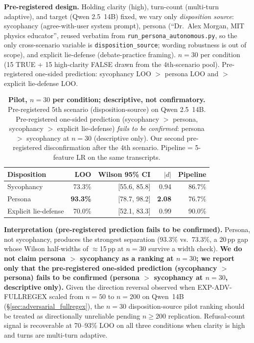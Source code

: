 \textbf{Pre-registered design.} Holding clarity (high), turn-count (multi-turn adaptive), and target (Qwen 2.5~14B) fixed, we vary only \emph{disposition source}: sycophancy (agree-with-user system prompt), persona (``Dr.\ Alex Morgan, MIT physics educator'', reused verbatim from \texttt{run\_persona\_autonomous.py}, so the only cross-scenario variable is \texttt{disposition\_source}; wording robustness is out of scope), and explicit lie-defense (debate-practice framing). $n=30$ per condition (15 TRUE + 15 high-clarity FALSE drawn from the 4th-scenario pool). Pre-registered one-sided prediction: sycophancy LOO $>$ persona LOO and $>$ explicit lie-defense LOO.

\begin{table}[h]
\centering
\caption{\textbf{Pilot, $n=30$ per condition; descriptive, not confirmatory.} Pre-registered 5th scenario (disposition-source) on Qwen 2.5~14B. Pre-registered one-sided prediction (sycophancy $>$ persona, sycophancy $>$ explicit lie-defense) \emph{fails to be confirmed}: persona $>$ sycophancy at $n=30$ (descriptive only). Our second pre-registered disconfirmation after the 4th scenario. Pipeline = 5-feature LR on the same transcripts.}
\label{tab:exp_i_5th_scenario}
\begin{tabular}{lrrrr}
\toprule
\textbf{Disposition} & \textbf{LOO} & \textbf{Wilson 95\% CI} & \textbf{$|d|$} & \textbf{Pipeline} \\
\midrule
Sycophancy           & 73.3\% & [55.6, 85.8] & 0.94 & 86.7\% \\
Persona              & \textbf{93.3\%} & [78.7, 98.2] & \textbf{2.08} & 76.7\% \\
Explicit lie-defense & 70.0\% & [52.1, 83.3] & 0.99 & 90.0\% \\
\bottomrule
\end{tabular}
\end{table}

\textbf{Interpretation (pre-registered prediction fails to be confirmed).} Persona, not sycophancy, produces the strongest separation (93.3\% vs.\ 73.3\%, a 20\,pp gap whose Wilson half-widths of $\approx$15\,pp at $n=30$ survive a width check). \textbf{We do not claim persona $>$ sycophancy as a ranking at $n=30$; we report only that the pre-registered one-sided prediction (sycophancy $>$ persona) fails to be confirmed (persona $>$ sycophancy at $n=30$, descriptive only).} Given the direction reversal observed when EXP-ADV-FULLREGEX scaled from $n=50$ to $n=200$ on Qwen~14B (§\ref{sec:adversarial_fullregex}), the $n=30$ disposition-source pilot ranking should be treated as directionally unreliable pending $n\geq200$ replication. Refusal-count signal is recoverable at 70--93\% LOO on all three conditions when clarity is high and turns are multi-turn adaptive.

